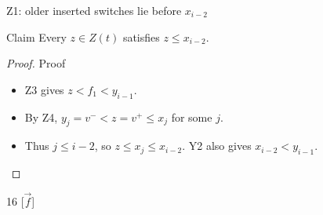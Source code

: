 \begin{frame}[t]{Z1: older inserted switches lie before $x_{i-2}$}
  \footnotesize{}
  \claimreminder{\Zthree\Zfour\Ytwo\Zinsertnotation}
  \begin{lemma}{Claim}
    Every $z\in Z(t)$ satisfies $z\leq x_{i-2}$.
  \end{lemma}
  \begin{proof}{Proof}
    \begin{itemize}[itemsep=4pt]
      \item<1-> Z3 gives $z<f_1<y_{i-1}$.
      \item<2-> By Z4, $y_j=v^-<z=v^+\leq x_j$ for some $j$.
      \item<3-> Thus $j\leq i-2$, so $z\leq x_j\leq x_{i-2}$.
        Y2 also gives $x_{i-2}<y_{i-1}$.
    \end{itemize}
  \end{proof}
  \begin{center}
    \begin{shiftchain}[
      column sep=6mm, row sep=6mm, dot radius=3pt,
      labels=false, label font=\scriptsize,
      switches={2,3,5/dashed,8,11},
      switch labels={2/$y_j$,3/\raisebox{-3mm}{$z$},5/$x_{i-2}$,8/$y_{i-1}$,11/$y_i$},
    ]{16}
      [$\vec f$]
    \end{shiftchain}
  \end{center}
\end{frame}

